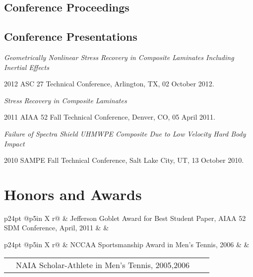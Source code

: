 \documentclass[10pt,letterpaper]{article}
\makeatletter
\renewenvironment{itemize}{
  \begin{list}{}{
    \setlength{\leftmargin}{30pt}
    \setlength{\itemsep}{0.2em}
    \setlength{\parskip}{0pt}
    \setlength{\parsep}{0.25em}
  }
}{
  \end{list}
}
\newcommand{\rowtabular}[4][3.7in]{%
  \begin{tabularx}{\linewidth}{p{24pt} @{}p{#1} X r@{}}%
    & #2 & #3 & #4 \\ [1.0pt]%
  \end{tabularx}%
}
\renewcommand{\textsuperscript}[1]{%
  \raisebox{2.5pt}{\scriptsize \hspace{0.3pt}#1}%
}
\makeatother
\begin{document}
\subsection*{Conference Proceedings}
\begin{biblist}
\item {}
\item {}
\item {}
\item {}
\end{biblist}

\subsection*{Conference Presentations}
\begin{itemize}
\item \textit{Geometrically Nonlinear Stress Recovery in Composite Laminates
    Including Inertial Effects}
  \begin{itemize}
  \item 2012 ASC 27\textsuperscript{nd} Technical Conference, Arlington, TX,
    02 October 2012.
  \end{itemize}
\item \textit{Stress Recovery in Composite Laminates}
  \begin{itemize}
  \item 2011 AIAA 52\textsuperscript{nd} Fall Technical Conference,
    Denver, CO,
    05 April 2011.
  \end{itemize}
\item \textit{Failure of Spectra Shield UHMWPE Composite Due to Low Velocity
    Hard Body Impact}
  \begin{itemize}
  \item 2010 SAMPE Fall Technical Conference,
    Salt Lake City, UT,
    13 October 2010.
  \end{itemize}
\end{itemize}

\section*{Honors and Awards}

\rowtabular[5in]{Jefferson Goblet Award for Best Student Paper, AIAA 52\textsuperscript{nd} SDM Conference, April, 2011}{}{}
\rowtabular[5in]{NCCAA Sportsmanship Award in Men's Tennis, 2006}{}{}
\rowtabular[5in]{NAIA Scholar-Athlete in Men's Tennis, 2005,2006}{}{}
\end{document}

